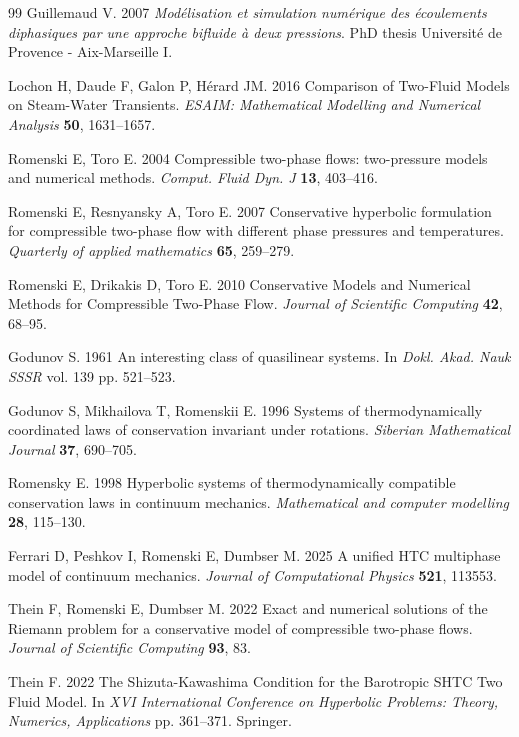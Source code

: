 \documentclass{myclass}
\begin{document}
\begin{thebibliography}{99}
Guillemaud V. 2007 {\em {Mod{\'e}lisation et simulation num{\'e}rique des
  {\'e}coulements diphasiques par une approche bifluide {\`a} deux pressions}}.
PhD thesis Universit{\'e} de Provence - Aix-Marseille I.

Lochon H, Daude F, Galon P, H{\'e}rard JM. 2016  Comparison of Two-Fluid Models
  on Steam-Water Transients. {\em ESAIM: Mathematical Modelling and Numerical
  Analysis} \textbf{50}, 1631--1657.

Romenski E, Toro E. 2004  Compressible two-phase flows: two-pressure models and
  numerical methods. {\em Comput. Fluid Dyn. J} \textbf{13}, 403--416.

Romenski E, Resnyansky A, Toro E. 2007  Conservative hyperbolic formulation for
  compressible two-phase flow with different phase pressures and temperatures.
  {\em Quarterly of applied mathematics} \textbf{65}, 259--279.

Romenski E, Drikakis D, Toro E. 2010  Conservative {M}odels and {N}umerical
  {M}ethods for {C}ompressible {T}wo-{P}hase {F}low. {\em Journal of Scientific
  Computing} \textbf{42}, 68--95.

Godunov S. 1961  An interesting class of quasilinear systems. In {\em Dokl.
  Akad. Nauk SSSR} vol. 139 pp. 521--523.

Godunov S, Mikhailova T, Romenskii E. 1996  Systems of thermodynamically
  coordinated laws of conservation invariant under rotations. {\em Siberian
  Mathematical Journal} \textbf{37}, 690--705.

Romensky E. 1998  Hyperbolic systems of thermodynamically compatible
  conservation laws in continuum mechanics. {\em Mathematical and computer
  modelling} \textbf{28}, 115--130.

Ferrari D, Peshkov I, Romenski E, Dumbser M. 2025  A unified {HTC} multiphase
  model of continuum mechanics. {\em Journal of Computational Physics}
  \textbf{521}, 113553.

Thein F, Romenski E, Dumbser M. 2022  Exact and numerical solutions of the
  {R}iemann problem for a conservative model of compressible two-phase flows.
  {\em Journal of Scientific Computing} \textbf{93}, 83.

Thein F. 2022  The {S}hizuta-{K}awashima {C}ondition for the {B}arotropic
  {SHTC} {T}wo {F}luid {M}odel. In {\em XVI International Conference on
  Hyperbolic Problems: Theory, Numerics, Applications} pp. 361--371. Springer.


\end{thebibliography}
\end{document}
